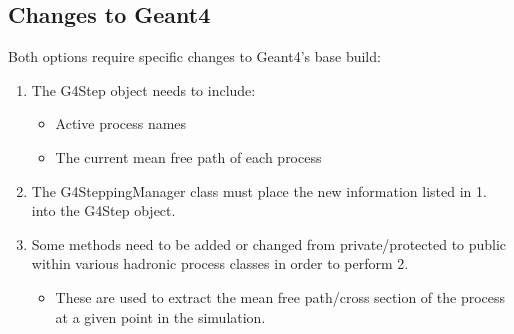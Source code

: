 \documentclass[12pt]{article}
\begin{document}
\subsection{Changes to Geant4}
Both options require specific changes to Geant4's base build:
\begin{enumerate}
\item The G4Step object needs to include:
	\begin{itemize}
	\item Active process names
	\item The current mean free path of each process
	\end{itemize}
	
\item The G4SteppingManager class must place the new information listed in 1. into the G4Step object. 

\item Some methods need to be added or changed from private/protected to public within various hadronic process classes in order to perform 2.
	\begin{itemize}
	\item These are used to extract the mean free path/cross section of the process at a given point in the simulation.
	\end{itemize}	
	
\end{enumerate}




%

%


%
%
\end{document}
